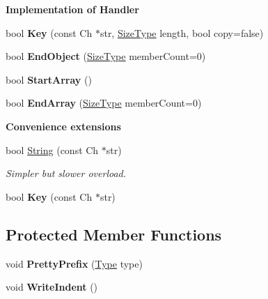 \begin{Indent}{\bf Implementation of Handler}
\begin{DoxyCompactItemize}
\item 
bool {\bfseries Key} (const Ch $\ast$str, \hyperlink{a00677_a5ed6e6e67250fadbd041127e6386dcb5}{Size\+Type} length, bool copy=false)\hypertarget{a00232_a20ecbe1d31a871e4da4a3899b40ad3cd}{}\label{a00232_a20ecbe1d31a871e4da4a3899b40ad3cd}

\item 
bool {\bfseries End\+Object} (\hyperlink{a00677_a5ed6e6e67250fadbd041127e6386dcb5}{Size\+Type} member\+Count=0)\hypertarget{a00232_a6bfdfa4193193ef763cce5c592c4d20c}{}\label{a00232_a6bfdfa4193193ef763cce5c592c4d20c}

\item 
bool {\bfseries Start\+Array} ()\hypertarget{a00232_aec7fdf4798a3af5e31c147633f4798ed}{}\label{a00232_aec7fdf4798a3af5e31c147633f4798ed}

\item 
bool {\bfseries End\+Array} (\hyperlink{a00677_a5ed6e6e67250fadbd041127e6386dcb5}{Size\+Type} member\+Count=0)\hypertarget{a00232_a1e9d97fc950d349f55abd864c787ff37}{}\label{a00232_a1e9d97fc950d349f55abd864c787ff37}

\end{DoxyCompactItemize}
\end{Indent}
\begin{Indent}{\bf Convenience extensions}\par
\begin{DoxyCompactItemize}
\item 
bool \hyperlink{a00232_a7e85689355a827d273f272c26b447225}{String} (const Ch $\ast$str)\hypertarget{a00232_a7e85689355a827d273f272c26b447225}{}\label{a00232_a7e85689355a827d273f272c26b447225}

\begin{DoxyCompactList}\small\item\em Simpler but slower overload. \end{DoxyCompactList}\item 
bool {\bfseries Key} (const Ch $\ast$str)\hypertarget{a00232_a4b2a2a6eef02c12d7a3fd77966bd4499}{}\label{a00232_a4b2a2a6eef02c12d7a3fd77966bd4499}

\end{DoxyCompactItemize}
\end{Indent}
\subsection*{Protected Member Functions}
\begin{DoxyCompactItemize}
\item 
void {\bfseries Pretty\+Prefix} (\hyperlink{a00677_a1d1cfd8ffb84e947f82999c682b666a7}{Type} type)\hypertarget{a00232_a09709ffa3b545e007631ecfd35029843}{}\label{a00232_a09709ffa3b545e007631ecfd35029843}

\item 
void {\bfseries Write\+Indent} ()\hypertarget{a00232_a6f244ecc94fd5b134d424033b1574b7e}{}\label{a00232_a6f244ecc94fd5b134d424033b1574b7e}

\end{DoxyCompactItemize}
